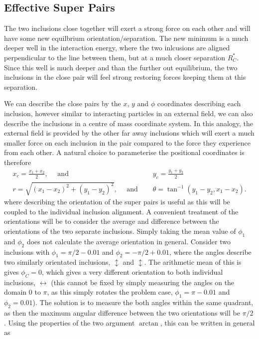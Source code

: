 \subsection{Effective Super Pairs}
The two inclusions close together will exert a strong force on each other and will have some new equilbrium orientation/separation. The new minimum is a much deeper well in the interaction energy, where the two inlcusions are aligned perpendicular to the line between them, but at a much closer separation $R^*_{C}$. Since this well is much deeper and  than the further out equilibrium, the two inclusions in the close pair will feel strong restoring forces keeping them at this separation. 

We can describe the close pairs by the $x$, $y$ and $\phi$ coordinates describing each inclusion, however similar to interacting particles in an external field, we can also describe the inclusions in a centre of mass coordinate system. In this analogy, the external field is provided by the other far away inclusions which will exert a much smaller force on each inclusion in the pair compared to the force they experience from each other. A natural choice to parameterise the positional coordinates is therefore
\begin{equation}
\begin{split}
x_c = \frac{x_1+x_2}{2}, \quad\text{ and }&\quad y_c = \frac{y_1+y_2}{2} \\
r =  \sqrt{(x_1-x_2)^2+(y_1-y_2)^2}, \quad\text{ and }&\quad \theta = \tan ^{-1}(y_1-y_2,x_1-x_2).
\end{split}
\end{equation}
where describing the orientation of the super pairs is useful as this will be coupled to the individual inclusion alignment. A convenient treatment of the orientations will be to consider the average and difference between the orientations of the two separate inclusions. Simply taking the mean value of $\phi_1$ and $\phi_2$ does not calculate the average orientation in general. Consider two inclusions with $\phi_1=\pi/2-0.01$ and $\phi_2=-\pi/2+0.01$, where the angles describe two similarly orientated inclusions, $\updownarrow$ and $\updownarrow$. The arithmetic mean of this is gives $\phi_C=0$, which gives a very different orientation to both individual inclusions, $\leftrightarrow$ (this cannot be fixed by simply measuring the angles on the domain $0$ to $\pi$, as this simply rotates the problem case, $\phi_1=\pi-0.01$ and $\phi_2=0.01$). The solution is to measure the both angles within the same quadrant, as then the maximum angular difference between the two orientations will be $\pi/2$. Using the properties of the two argument $\arctan$, this can be written in general as
